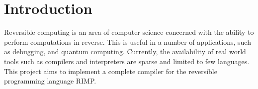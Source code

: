 \chapter*{Introduction}

Reversible computing is an area of computer science concerned with the ability to perform computations in reverse.
This is useful in a number of applications, such as debugging, and quantum computing.
Currently, the availability of real world tools such as compilers and interpreters are sparse and limited to few languages.
This project aims to implement a complete compiler for the reversible programming language RIMP\@.

